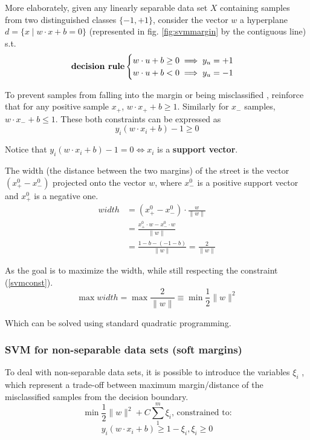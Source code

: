 More elaborately, given any linearly separable data set $X$ containing samples from two distinguished classes $\{-1, +1\}$, consider the vector $w$ a hyperplane $d = \{x \mid w \cdot x + b = 0\}$ (represented in fig. \ref{fig:svmmargin} by the contiguous line) s.t.
$$\text{\textbf{decision rule}} \begin{cases}
	w \cdot u +b \geq 0 \implies y_u=+1\\
	w \cdot u +b < 0 \implies y_u=-1\\
\end{cases}$$

To prevent samples from falling into the margin or being misclassified \cite{wessvmdef}, reinforce that for any positive sample $x_+$, $w \cdot x_+ +b \geq 1$. Similarly for $x_-$ samples, $w \cdot x_- +b \leq 1$. These both constraints can be expressed as
\begin{equation} \label{svmconst}
y_i(w \cdot x_i +b) -1 \geq 0
\end{equation}

Notice that $y_i(w \cdot x_i +b) -1 = 0 \iff x_i $ is a \textbf{support vector}.

The width (the distance between the two margins) of the street is the vector $(x_+^0 -x_-^0)$ projected onto the vector $w$, where $x_-^0$ is a positive support vector and $x_+^0$ is a negative one.
\begin{equation} \label{eq:eqsvmwidth}
\begin{split}
width &= (x_+^0 - x_-^0) \cdot \frac{w}{\|w\|} \\
      &=\frac{x_+^0 \cdot w - x_-^0 \cdot w}{\|w\|} \\
      &=\frac{1-b - (-1-b)}{\|w\|} = \frac{2}{\|w\|}
\end{split}
\end{equation}

As the goal is to maximize the width, while still respecting the constraint (\ref{svmconst}).
\begin{equation} \label{eq:svmminw}
	\max width = \max \frac{2}{\|w\|} \equiv \min \frac{1}{2} \|w\|^2
\end{equation}

Which can be solved using standard quadratic programming.

\subsubsection{SVM for non-separable data sets (soft margins)}

To deal with non-separable data sets, it is possible to introduce the variables $\xi_i$ \cite{wessvmdef}, which represent a trade-off between maximum margin/distance of the misclassified samples from the decision boundary.
$$\min \frac{1}{2} \|w\|^2 + C \sum_{1}^{m}\xi_i \text{, constrained to:}$$
$$y_i(w \cdot x_i +b) \geq 1- \xi_i, \xi_i \geq 0$$

